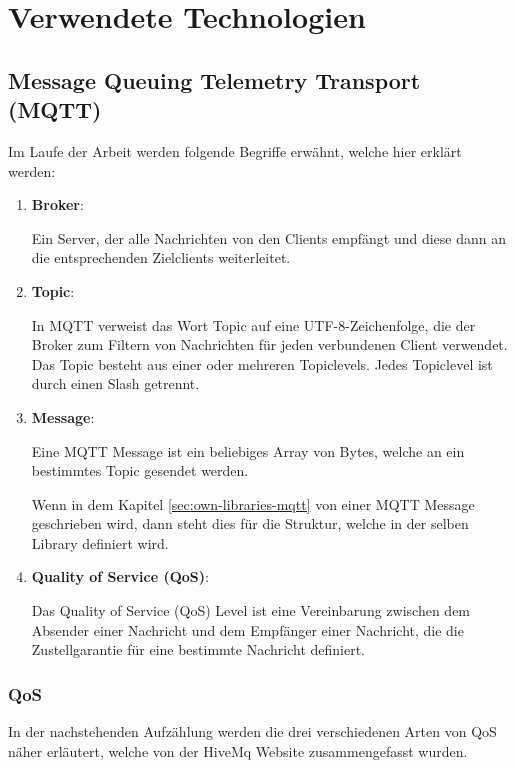 \chapter{Verwendete Technologien}\label{cha:used-technologies}

\section{Message Queuing Telemetry Transport (MQTT)}\label{sec:mqtt}

Im Laufe der Arbeit werden folgende Begriffe erwähnt, welche hier erklärt werden:

\begin{enumerate}
    \item \textbf{Broker}:
    
    Ein Server, der alle Nachrichten von den Clients empfängt und diese dann an die entsprechenden Zielclients weiterleitet.

    \item \textbf{Topic}:
    
    In MQTT verweist das Wort Topic auf eine UTF-8-Zeichenfolge, die der Broker zum Filtern von Nachrichten für jeden verbundenen Client verwendet. Das Topic besteht aus einer oder mehreren Topiclevels. Jedes Topiclevel ist durch einen Slash getrennt.
    
    \item \textbf{Message}:
    
    Eine MQTT Message ist ein beliebiges Array von Bytes, welche an ein bestimmtes Topic gesendet werden.

    Wenn in dem Kapitel \ref{sec:own-libraries-mqtt} von einer MQTT Message geschrieben wird, dann steht dies für die Struktur, welche in der selben Library definiert wird.

    \item \textbf{Quality of Service (QoS)}:
    
    Das Quality of Service (QoS) Level ist eine Vereinbarung zwischen dem Absender einer Nachricht und dem Empfänger einer Nachricht, die die Zustellgarantie für eine bestimmte Nachricht definiert.
\end{enumerate}

\subsection{QoS}\label{sec:mqtt-qos}

In der nachstehenden Aufzählung werden die drei verschiedenen Arten von QoS näher erläutert, welche von der HiveMq Website\cite{hivemq} zusammengefasst wurden.

